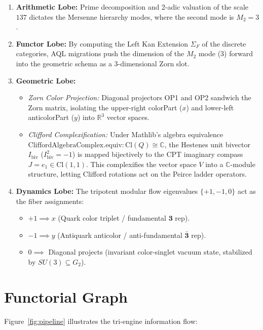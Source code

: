 \documentclass{article}
\begin{document}
\begin{enumerate}
    \item \textbf{Arithmetic Lobe:} Prime decomposition and 2-adic valuation of
    the scale $137$ dictates the Mersenne hierarchy modes, where the second mode
    is $M_2 = 3$.
    \item \textbf{Functor Lobe:} By computing the Left Kan Extension $\Sigma_F$
    of the discrete categories, AQL migrations push the dimension of the $M_2$
    mode ($3$) forward into the geometric schema as a $3$-dimensional Zorn slot.
    \item \textbf{Geometric Lobe:}
    \begin{itemize}
        \item \emph{Zorn Color Projection:} Diagonal projectors OP1 and OP2
        sandwich the Zorn matrix, isolating the upper-right colorPart ($x$)
        and lower-left anticolorPart ($y$) into $\mathbb{R}^3$ vector spaces.
        \item \emph{Clifford Complexification:} Under Mathlib's algebra
        equivalence $\text{CliffordAlgebraComplex.equiv} : \text{Cl}(Q) \cong \mathbb{C}$,
        the Hestenes unit bivector $I_{\text{biv}}$ ($I_{\text{biv}}^2 = -1$) is mapped
        bijectively to the CPT imaginary compass $J = e_1 \in \text{Cl}(1,1)$. This
        complexifies the vector space $V$ into a $\mathbb{C}$-module structure, letting
        Clifford rotations act on the Peirce ladder operators.
    \end{itemize}
    \item \textbf{Dynamics Lobe:} The tripotent modular flow eigenvalues
    $\{+1, -1, 0\}$ act as the fiber assignments:
    \begin{itemize}
        \item $+1 \implies x$ (Quark color triplet / fundamental $\mathbf{3}$ rep).
        \item $-1 \implies y$ (Antiquark anticolor / anti-fundamental $\mathbf{\bar{3}}$ rep).
        \item $0 \implies$ Diagonal projects (invariant color-singlet vacuum state, stabilized
        by $SU(3) \subseteq G_2$).
    \end{itemize}
\end{enumerate}

\section{Functorial Graph}
Figure~\ref{fig:pipeline} illustrates the tri-engine information flow:
\end{document}
